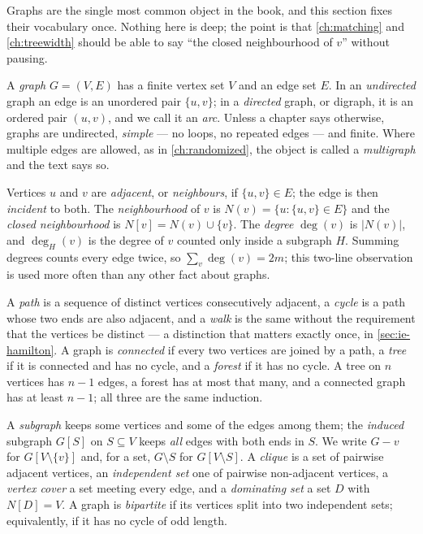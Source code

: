 Graphs are the single most common object in the book, and this section fixes
their vocabulary once. Nothing here is deep; the point is that
\cref{ch:matching} and \cref{ch:treewidth} should be able to say ``the closed
neighbourhood of $v$'' without pausing.

A \emph{graph} $G = (V,E)$ has a finite vertex set $V$ and an edge set $E$. In
an \emph{undirected} graph an edge is an unordered pair $\{u,v\}$; in a
\emph{directed} graph, or digraph, it is an ordered pair $(u,v)$, and we call
it an \emph{arc}. Unless a chapter says otherwise, graphs are undirected,
\emph{simple} --- no loops, no repeated edges --- and finite. Where multiple
edges are allowed, as in \cref{ch:randomized}, the object is called a
\emph{multigraph} and the text says so.

Vertices $u$ and $v$ are \emph{adjacent}, or \emph{neighbours}, if
$\{u,v\} \in E$; the edge is then \emph{incident} to both. The
\emph{neighbourhood} of $v$ is $N(v) = \{u : \{u,v\} \in E\}$ and the
\emph{closed neighbourhood} is $N[v] = N(v) \cup \{v\}$. The \emph{degree}
$\deg(v)$ is $|N(v)|$, and $\deg_H(v)$ is the degree of $v$ counted only inside
a subgraph $H$. Summing degrees counts every edge twice, so
$\sum_{v} \deg(v) = 2m$; this two-line observation is used more often than any
other fact about graphs.

A \emph{path} is a sequence of distinct vertices consecutively adjacent, a
\emph{cycle} is a path whose two ends are also adjacent, and a \emph{walk} is
the same without the requirement that the vertices be distinct --- a
distinction that matters exactly once, in \cref{sec:ie-hamilton}. A graph is
\emph{connected} if every two vertices are joined by a path, a \emph{tree} if
it is connected and has no cycle, and a \emph{forest} if it has no cycle. A
tree on $n$ vertices has $n-1$ edges, a forest has at most that many, and a connected graph
has at least $n-1$; all three are the same induction.

A \emph{subgraph} keeps some vertices and some of the edges among them; the
\emph{induced} subgraph $G[S]$ on $S \subseteq V$ keeps \emph{all} edges with
both ends in $S$. We write $G - v$ for $G[V \setminus \{v\}]$ and, for a set,
$G \setminus S$ for $G[V \setminus S]$. A \emph{clique} is a set of pairwise
adjacent vertices, an \emph{independent set} one of pairwise non-adjacent
vertices, a \emph{vertex cover} a set meeting every edge, and a
\emph{dominating set} a set $D$ with $N[D] = V$. A graph is \emph{bipartite} if
its vertices split into two independent sets; equivalently, if it has no cycle
of odd length.

